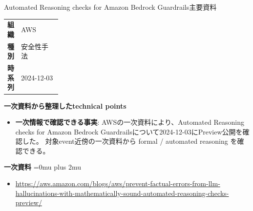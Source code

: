 \begin{technicalnote}{Automated Reasoning checks for Amazon Bedrock Guardrails}{主要資料}
\begingroup
\begin{tabularx}{\linewidth}{@{}>{\bfseries}p{0.22\linewidth}X@{}}
組織 & AWS \\
種別 & 安全性手法 \\
時系列 & 2024-12-03 \\
\end{tabularx}
\smallskip
{\bfseries 一次資料から整理したtechnical points}
\begin{itemize}[leftmargin=1.5em,itemsep=0.35em]
\item \textbf{一次情報で確認できる事実}: AWSの一次資料により、Automated Reasoning checks for Amazon Bedrock Guardrailsについて2024-12-03にPreview公開を確認した。 対象event近傍の一次資料から formal / automated reasoning を確認できる。
\end{itemize}
\begin{minipage}{\linewidth}
\begin{samepage}
{\bfseries 一次資料}
\begingroup\sloppy
\Urlmuskip=0mu plus 2mu\relax
\begin{itemize}[leftmargin=1.5em,itemsep=0.25em]
\item {\scriptsize\url{https://aws.amazon.com/blogs/aws/prevent-factual-errors-from-llm-hallucinations-with-mathematically-sound-automated-reasoning-checks-preview/}}
\end{itemize}
\endgroup
\end{samepage}
\end{minipage}
\endgroup
\end{technicalnote}
\medskip

